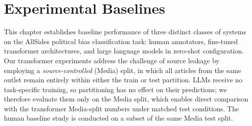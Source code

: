 \chapter{Experimental Baselines}
\label{sec:baselines}

This chapter establishes baseline performance of three distinct classes of systems on the AllSides political bias classification task: human annotators, fine-tuned transformer architectures, and large language models in zero-shot configuration. Our transformer experiments address the challenge of source leakage by employing a \emph{source-controlled} (Media) split, in which all articles from the same outlet remain entirely within either the train or test partition. LLMs receive no task-specific training, so partitioning has no effect on their predictions; we therefore evaluate them only on the Media split, which enables direct comparison with the transformer Media-split numbers under matched test conditions. The human baseline study is conducted on a subset of the same Media test split.






